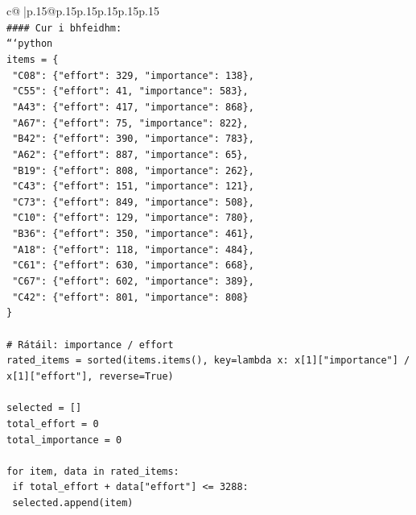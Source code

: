 \documentclass{article}
\begin{document}
{\begin{supertabular}{c@{$\;$}|p{.15\linewidth}@{}p{.15\linewidth}p{.15\linewidth}p{.15\linewidth}p{.15\linewidth}p{.15\linewidth}}
{{{\\ 
\texttt{\#\#\#\# Cur i bhfeidhm:} \\
\texttt{```python} \\
\texttt{items = \{} \\
\texttt{    "C08": \{"effort": 329, "importance": 138\},} \\
\texttt{    "C55": \{"effort": 41, "importance": 583\},} \\
\texttt{    "A43": \{"effort": 417, "importance": 868\},} \\
\texttt{    "A67": \{"effort": 75, "importance": 822\},} \\
\texttt{    "B42": \{"effort": 390, "importance": 783\},} \\
\texttt{    "A62": \{"effort": 887, "importance": 65\},} \\
\texttt{    "B19": \{"effort": 808, "importance": 262\},} \\
\texttt{    "C43": \{"effort": 151, "importance": 121\},} \\
\texttt{    "C73": \{"effort": 849, "importance": 508\},} \\
\texttt{    "C10": \{"effort": 129, "importance": 780\},} \\
\texttt{    "B36": \{"effort": 350, "importance": 461\},} \\
\texttt{    "A18": \{"effort": 118, "importance": 484\},} \\
\texttt{    "C61": \{"effort": 630, "importance": 668\},} \\
\texttt{    "C67": \{"effort": 602, "importance": 389\},} \\
\texttt{    "C42": \{"effort": 801, "importance": 808\}} \\
\texttt{\}} \\
\\ 
\texttt{\# Rátáil: importance / effort} \\
\texttt{rated\_items = sorted(items.items(), key=lambda x: x{[}1{]}{[}"importance"{]} / x{[}1{]}{[}"effort"{]}, reverse=True)} \\
\\ 
\texttt{selected = {[}{]}} \\
\texttt{total\_effort = 0} \\
\texttt{total\_importance = 0} \\
\\ 
\texttt{for item, data in rated\_items:} \\
\texttt{    if total\_effort + data{[}"effort"{]} <= 3288:} \\
\texttt{        selected.append(item)} \\
}}}
\end{supertabular}}
\end{document}
